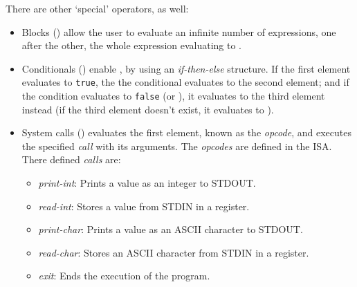 \noindent
There are other `special' operators, as well:
\begin{itemize}
 \item Blocks () allow the user to evaluate an infinite number of expressions, one after the other, the whole expression evaluating to .
 \item Conditionals () enable , by using an \textit{if-then-else} structure. If the first element evaluates to \texttt{true}, the the conditional evaluates to the second element; and if the condition evaluates to \texttt{false} (or ), it evaluates to the third element instead (if the third element doesn't exist, it evaluates to ).
 \item System calls () evaluates the first element, known as the \textit{opcode}, and executes the specified \textit{call} with its arguments. The \textit{opcodes} are defined in the \gls{ISA}. There defined \textit{calls} are:
 \begin{itemize}[nosep]
    \item \textit{print-int}: Prints a value as an integer to \gls{STDOUT}.
    \item \textit{read-int}: Stores a value from \gls{STDIN} in a register.
    \item \textit{print-char}: Prints a value as an ASCII character to \gls{STDOUT}.
    \item \textit{read-char}: Stores an ASCII character from \gls{STDIN} in a register.
    \item \textit{exit}: Ends the execution of the program.
  \end{itemize}
\end{itemize}

